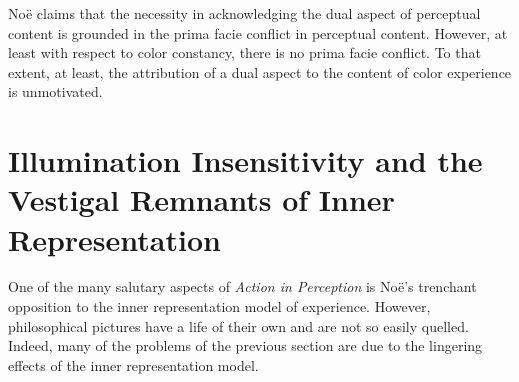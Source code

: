 \documentclass[12pt]{article}
\begin{document}

\vfill

\noindent Noë claims that the necessity in acknowledging the dual aspect of perceptual content is grounded in the prima facie conflict in perceptual content. However, at least with respect to color constancy, there is no prima facie conflict. To that extent, at least, the attribution of a dual aspect to the content of color experience is unmotivated.

% 
% 
% 
% 



\section{Illumination Insensitivity and the Vestigal Remnants of Inner Representation} %
\label{sec:vestigal_remnants_of_inner_representations}

One of the many salutary aspects of \emph{Action in Perception} is Noë's trenchant opposition to the inner representation model of experience. However, philosophical pictures have a life of their own and are not so easily quelled. Indeed, many of the problems of the previous section are due to the lingering effects of the inner representation model.
\end{document}
